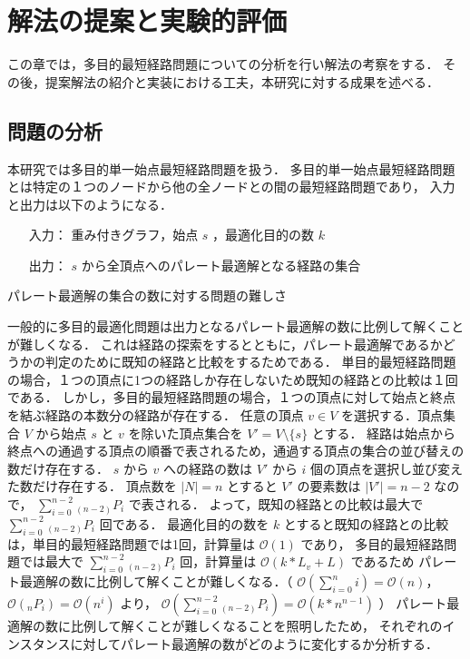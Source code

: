 \documentclass[12pt]{optlab-bachelor}
\begin{document}
\chapter{解法の提案と実験的評価}
この章では，多目的最短経路問題についての分析を行い解法の考察をする．
その後，提案解法の紹介と実装における工夫，本研究に対する成果を述べる．

\section{問題の分析}
本研究では多目的単一始点最短経路問題を扱う．
多目的単一始点最短経路問題とは特定の１つのノードから他の全ノードとの間の最短経路問題であり，
入力と出力は以下のようになる．
\begin{itemize}
  \item[入力：]重み付きグラフ，始点 $s$ ，最適化目的の数 $k$
  \item[出力：]$s$ から全頂点へのパレート最適解となる経路の集合
\end{itemize}

\begin{description}
  \item[パレート最適解の集合の数に対する問題の難しさ]
\end{description}

一般的に多目的最適化問題は出力となるパレート最適解の数に比例して解くことが難しくなる．
これは経路の探索をするとともに，パレート最適解であるかどうかの判定のために既知の経路と比較をするためである．
単目的最短経路問題の場合，１つの頂点に1つの経路しか存在しないため既知の経路との比較は１回である．
しかし，多目的最短経路問題の場合，１つの頂点に対して始点と終点を結ぶ経路の本数分の経路が存在する．
任意の頂点 $v \in V$ を選択する．頂点集合 $V$ から始点 $s$ と $v$ を除いた頂点集合を $V'=V \setminus \{s\}$ とする．
経路は始点から終点への通過する頂点の順番で表されるため，通過する頂点の集合の並び替えの数だけ存在する．
$s$ から $v$ への経路の数は $V'$ から $i$ 個の頂点を選択し並び変えた数だけ存在する．
頂点数を $|N|=n$ とすると $V'$ の要素数は $|V'|=n-2$ なので，
$\displaystyle \sum_{i=0}^{n-2} {}_{(n-2)}P_i$ で表される．
よって，既知の経路との比較は最大で $\displaystyle \sum_{i=0}^{n-2} {}_{(n-2)}P_i$ 回である．
最適化目的の数を $k$ とすると既知の経路との比較は，単目的最短経路問題では1回，計算量は $\mathcal{O}(1)$ であり，
多目的最短経路問題では最大で $\displaystyle \sum_{i=0}^{n-2} {}_{(n-2)}P_i$ 回，計算量は $\mathcal{O}(k* L_v+L)$ であるため
パレート最適解の数に比例して解くことが難しくなる．（ $\mathcal{O}(\displaystyle \sum_{i=0}^{n} i)=\mathcal{O}(n)$，$\mathcal{O}({}_nP_i)=\mathcal{O}(n^i)$ より，
$\mathcal{O}(\displaystyle \sum_{i=0}^{n-2} {}_{(n-2)}P_i)=\mathcal{O}(k*n^{n-1})$ ）
パレート最適解の数に比例して解くことが難しくなることを照明したため，
それぞれのインスタンスに対してパレート最適解の数がどのように変化するか分析する．
\end{document}

